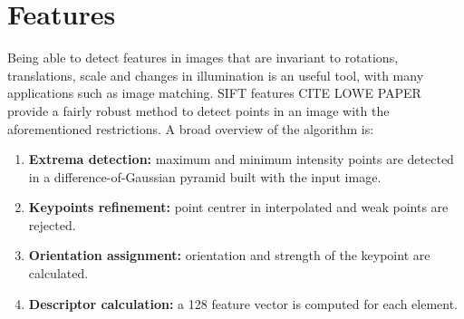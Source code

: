 \documentclass[12pt]{article}
\begin{document}
\section{Features}

Being able to detect features in images that are invariant to rotations, translations, scale and changes in illumination is an useful tool, with many applications such as image matching.
SIFT features CITE LOWE PAPER provide a fairly robust method to detect points in an image with the aforementioned restrictions.
A broad overview of the algorithm is:
\begin{enumerate}
\item \textbf{Extrema detection:} maximum and minimum intensity points are detected in a difference-of-Gaussian pyramid built with the input image.
\item \textbf{Keypoints refinement:} point centrer in interpolated and weak points are rejected.
\item \textbf{Orientation assignment:} orientation and strength of the keypoint are calculated.
\item \textbf{Descriptor calculation:} a 128 feature vector is computed for each element.
\end{enumerate}
\end{document}
